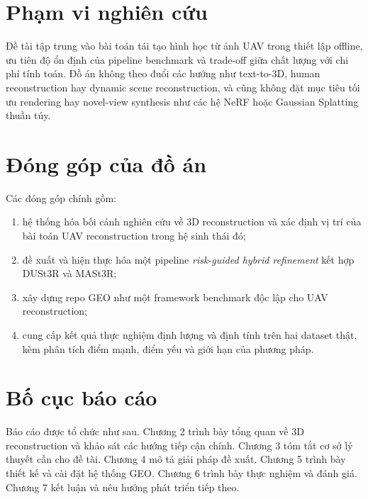 \documentclass[../DoAn.tex]{subfiles}
\begin{document}
\section{Phạm vi nghiên cứu}

Đề tài tập trung vào bài toán tái tạo hình học từ ảnh UAV trong thiết lập offline, ưu tiên độ ổn định của pipeline benchmark và trade-off giữa chất lượng với chi phí tính toán. Đồ án không theo đuổi các hướng như text-to-3D, human reconstruction hay dynamic scene reconstruction, và cũng không đặt mục tiêu tối ưu rendering hay novel-view synthesis như các hệ NeRF hoặc Gaussian Splatting thuần túy.

\section{Đóng góp của đồ án}

Các đóng góp chính gồm:
\begin{enumerate}[leftmargin=1.5em]
  \item hệ thống hóa bối cảnh nghiên cứu về 3D reconstruction và xác định vị trí của bài toán UAV reconstruction trong hệ sinh thái đó;
  \item đề xuất và hiện thực hóa một pipeline \textit{risk-guided hybrid refinement} kết hợp DUSt3R và MASt3R;
  \item xây dựng repo GEO như một framework benchmark độc lập cho UAV reconstruction;
  \item cung cấp kết quả thực nghiệm định lượng và định tính trên hai dataset thật, kèm phân tích điểm mạnh, điểm yếu và giới hạn của phương pháp.
\end{enumerate}

\section{Bố cục báo cáo}

Báo cáo được tổ chức như sau. Chương 2 trình bày tổng quan về 3D reconstruction và khảo sát các hướng tiếp cận chính. Chương 3 tóm tắt cơ sở lý thuyết cần cho đề tài. Chương 4 mô tả giải pháp đề xuất. Chương 5 trình bày thiết kế và cài đặt hệ thống GEO. Chương 6 trình bày thực nghiệm và đánh giá. Chương 7 kết luận và nêu hướng phát triển tiếp theo.
\end{document}
